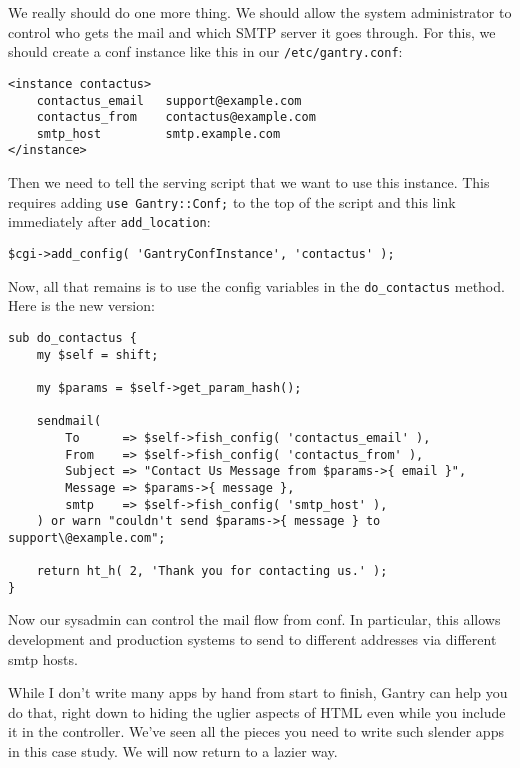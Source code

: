 We really should do one more thing.  We should allow the system administrator
to control who gets the mail and which SMTP server it goes through.  For this,
we should create a conf instance like this in our \verb+/etc/gantry.conf+:

\begin{verbatim}
<instance contactus>
    contactus_email   support@example.com
    contactus_from    contactus@example.com
    smtp_host         smtp.example.com
</instance>
\end{verbatim}

Then we need to tell the serving script that we want to use this instance.
This requires adding \verb+use Gantry::Conf;+ to the top of the script and
this link immediately after \verb+add_location+:

\begin{verbatim}
$cgi->add_config( 'GantryConfInstance', 'contactus' );
\end{verbatim}

Now, all that remains is to use the config variables in the
\verb+do_contactus+ method.  Here is the new version:

\begin{verbatim}
sub do_contactus {
    my $self = shift;

    my $params = $self->get_param_hash();

    sendmail(
        To      => $self->fish_config( 'contactus_email' ),
        From    => $self->fish_config( 'contactus_from' ),
        Subject => "Contact Us Message from $params->{ email }",
        Message => $params->{ message },
        smtp    => $self->fish_config( 'smtp_host' ),
    ) or warn "couldn't send $params->{ message } to support\@example.com";

    return ht_h( 2, 'Thank you for contacting us.' );
}
\end{verbatim}

Now our sysadmin can control the mail flow from conf.  In particular, this
allows development and production systems to send to different addresses
via different smtp hosts.

While I don't write many apps by hand from start to finish, Gantry can help
you do that, right down to hiding the uglier aspects of HTML even while
you include it in the controller.  We've seen all the pieces you need to
write such slender apps in this case study.  We will now return to a lazier
way.
